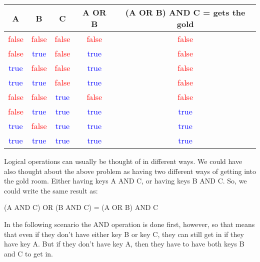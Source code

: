 \begin{center}
	\begin{tabular}{c | c | c | c | c}
		A & B & C & A OR B & (A OR B) AND C = gets the gold\\ \hline
		\textcolor{red}{false} & \textcolor{red}{false} & \textcolor{red}{false} & \textcolor{red}{false} & \textcolor{red}{false}\\ \hline
		\textcolor{red}{false} & \textcolor{blue}{true} & \textcolor{red}{false} & \textcolor{blue}{true} & \textcolor{red}{false}\\ \hline
		\textcolor{blue}{true} & \textcolor{red}{false} & \textcolor{red}{false} & \textcolor{blue}{true} & \textcolor{red}{false}\\ \hline
		\textcolor{blue}{true} & \textcolor{blue}{true} & \textcolor{red}{false} & \textcolor{blue}{true} & \textcolor{red}{false}\\ \hline

		\textcolor{red}{false} & \textcolor{red}{false} & \textcolor{blue}{true} & \textcolor{red}{false} & \textcolor{red}{false}\\ \hline
		\textcolor{red}{false} & \textcolor{blue}{true} & \textcolor{blue}{true} & \textcolor{blue}{true} & \textcolor{blue}{true}\\ \hline
		\textcolor{blue}{true} & \textcolor{red}{false} & \textcolor{blue}{true} & \textcolor{blue}{true} & \textcolor{blue}{true}\\ \hline
		\textcolor{blue}{true} & \textcolor{blue}{true} & \textcolor{blue}{true} & \textcolor{blue}{true} & \textcolor{blue}{true}\\ \hline
	\end{tabular}
\end{center}

Logical operations can usually be thought of in different ways. We could have also thought about the above problem as having two different ways of getting into the gold room. Either having keys A AND C, or having keys B AND C. So, we could write the same result as:\\

\begin{center}
	(A AND C) OR (B AND C) = (A OR B) AND C
\end{center}

In the following scenario the AND operation is done first, however, so that means that even if they don't have either key B or key C, they can still get in if they have key A. But if they don't have key A, then they have to have both keys B and C to get in.\\

